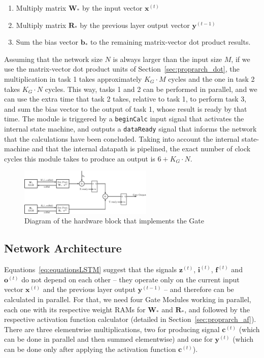 \documentclass[conference]{IEEEtran}
\newcommand{\mb}[1]{\mathbf{#1}}
\begin{document}
\begin{enumerate}
    \item Multiply matrix $\mb{W}_*$ by the input vector $\mb{x}^{(t)}$
    \item Multiply matrix $\mb{R}_*$ by the previous layer output vector $\mb{y}^{(t-1)}$
    \item Sum the bias vector $\mb{b}_*$ to the remaining matrix-vector dot product results.
\end{enumerate}
Assuming that the network size $N$ is always larger than the input size $M$, if we use the matrix-vector dot product units of Section~\ref{sec:proprarch_dot}, the multiplication
in task 1 takes approximately $K_G\cdot M$ cycles and the one in task 2 takes $K_G\cdot N$ cycles. This way, tasks 1 and 2 can be performed in parallel, and we can use the extra
time that task 2 takes, relative to task 1,  to perform task 3, and sum the bias vector to the output of task 1, whose result is ready by that time. The module is triggered by a
\verb+beginCalc+ input signal that activates the internal state machine, and outputs a \verb+dataReady+ signal that informs the network that the calculations have been concluded. 
Taking into account the internal state-machine and that the internal datapath is pipelined, the exact number
of clock cycles this module takes to produce an output is $6+K_G\cdot N$.

\begin{figure}
    \centering
    \includegraphics[width=2.5in]{figures/gate.eps}
    \caption[Diagram of the hardware block that implements the Gate]{Diagram of the hardware block that implements the Gate}
    \label{fig:gate}
\end{figure}

\subsection{Network Architecture}\label{sec:proprarch_net}
Equations~\ref{eq:equationsLSTM} suggest that the signals $\mb{z}^{(t)}$, $\mb{i}^{(t)}$, $\mb{f}^{(t)}$ and $\mb{o}^{(t)}$ do not depend on each other -- they
operate only on the current input vector $\mb{x}^{(t)}$ and the previous layer output $\mb{y}^{(t-1)}$ -- and therefore can be calculated in parallel. For that, we
need four Gate Modules working in parallel, each one with its respective weight RAMs for $\mb{W}_*$ and $\mb{R}_*$, and followed by the respective activation
function calculator (detailed in Section~\ref{sec:proprarch_af}). There are three elementwise multiplications, two for producing signal $\mb{c}^{(t)}$ (which
can be done in parallel and then summed elementwise) and one for $\mb{y}^{(t)}$ (which can be done only after applying the activation function $\mb{c}^{(t)}$).
\end{document}
